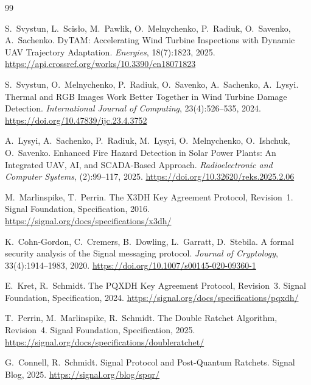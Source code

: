 \documentclass[11pt,a4paper]{article}
\theoremstyle{definition}
\begin{document}


\begin{thebibliography}{99}

S.~Svystun, L.~Scis{\l}o, M.~Pawlik, O.~Melnychenko, P.~Radiuk, O.~Savenko, A.~Sachenko.
\newblock DyTAM: Accelerating Wind Turbine Inspections with Dynamic UAV Trajectory Adaptation.
\newblock \emph{Energies}, 18(7):1823, 2025.
\newblock \url{https://api.crossref.org/works/10.3390/en18071823}

S.~Svystun, O.~Melnychenko, P.~Radiuk, O.~Savenko, A.~Sachenko, A.~Lysyi.
\newblock Thermal and RGB Images Work Better Together in Wind Turbine Damage Detection.
\newblock \emph{International Journal of Computing}, 23(4):526--535, 2024.
\newblock \url{https://doi.org/10.47839/ijc.23.4.3752}

A.~Lysyi, A.~Sachenko, P.~Radiuk, M.~Lysyi, O.~Melnychenko, O.~Ishchuk, O.~Savenko.
\newblock Enhanced Fire Hazard Detection in Solar Power Plants: An Integrated UAV, AI, and SCADA-Based Approach.
\newblock \emph{Radioelectronic and Computer Systems}, (2):99--117, 2025.
\newblock \url{https://doi.org/10.32620/reks.2025.2.06}

M.~Marlinspike, T.~Perrin.
\newblock The X3DH Key Agreement Protocol, Revision~1.
\newblock Signal Foundation, Specification, 2016.
\newblock \url{https://signal.org/docs/specifications/x3dh/}

K.~Cohn-Gordon, C.~Cremers, B.~Dowling, L.~Garratt, D.~Stebila.
\newblock A formal security analysis of the Signal messaging protocol.
\newblock \emph{Journal of Cryptology}, 33(4):1914--1983, 2020.
\newblock \url{https://doi.org/10.1007/s00145-020-09360-1}

E.~Kret, R.~Schmidt.
\newblock The PQXDH Key Agreement Protocol, Revision~3.
\newblock Signal Foundation, Specification, 2024.
\newblock \url{https://signal.org/docs/specifications/pqxdh/}

T.~Perrin, M.~Marlinspike, R.~Schmidt.
\newblock The Double Ratchet Algorithm, Revision~4.
\newblock Signal Foundation, Specification, 2025.
\newblock \url{https://signal.org/docs/specifications/doubleratchet/}

G.~Connell, R.~Schmidt.
\newblock Signal Protocol and Post-Quantum Ratchets.
\newblock Signal Blog, 2025.
\newblock \url{https://signal.org/blog/spqr/}


\end{thebibliography}
\end{document}
